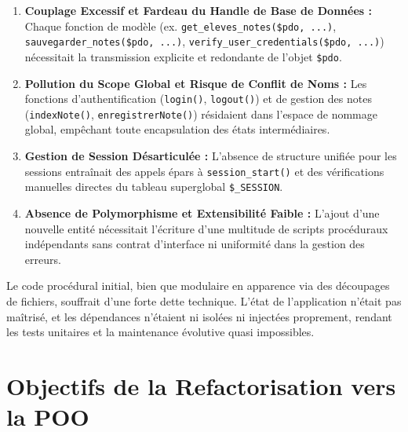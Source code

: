 \documentclass[11pt,a4paper,oneside]{report}
\begin{document}
\begin{enumerate}
    \item \textbf{Couplage Excessif et Fardeau du Handle de Base de Données :} Chaque fonction de modèle (ex. \texttt{get\_eleves\_notes(\$pdo, ...)}, \texttt{sauvegarder\_notes(\$pdo, ...)}, \texttt{verify\_user\_credentials(\$pdo, ...)}) nécessitait la transmission explicite et redondante de l'objet \texttt{\$pdo}.
    \item \textbf{Pollution du Scope Global et Risque de Conflit de Noms :} Les fonctions d'authentification (\texttt{login()}, \texttt{logout()}) et de gestion des notes (\texttt{indexNote()}, \texttt{enregistrerNote()}) résidaient dans l'espace de nommage global, empêchant toute encapsulation des états intermédiaires.
    \item \textbf{Gestion de Session Désarticulée :} L'absence de structure unifiée pour les sessions entraînait des appels épars à \texttt{session\_start()} et des vérifications manuelles directes du tableau superglobal \texttt{\$\_SESSION}.
    \item \textbf{Absence de Polymorphisme et Extensibilité Faible :} L'ajout d'une nouvelle entité nécessitait l'écriture d'une multitude de scripts procéduraux indépendants sans contrat d'interface ni uniformité dans la gestion des erreurs.
\end{enumerate}

\begin{warningBox}
Le code procédural initial, bien que modulaire en apparence via des découpages de fichiers, souffrait d'une forte dette technique. L'état de l'application n'était pas maîtrisé, et les dépendances n'étaient ni isolées ni injectées proprement, rendant les tests unitaires et la maintenance évolutive quasi impossibles.
\end{warningBox}

\section{Objectifs de la Refactorisation vers la POO}
\end{document}
